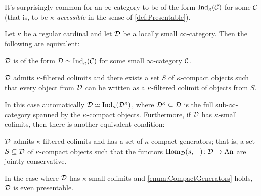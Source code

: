 It's surprisingly common for an $\infty$-category to be of the form $\mathrm{Ind}_\kappa(\mathcal{C})$ for some $\mathcal{C}$ (that is, to be \emph{$\kappa$-accessible} in the sense of \cref{def:Presentable}).
\begin{lem}\label{lem:KappaCompactlyGenerated}
	Let $\kappa$ be a regular cardinal and let $\mathcal{D}$ be a locally small $\infty$-category. Then the following are equivalent:
	\begin{alphanumerate}
		\item $\mathcal{D}$ is of the form $\mathcal{D}\simeq \mathrm{Ind}_\kappa(\mathcal{C})$ for some small $\infty$-category $\mathcal{C}$.\label{enum:DIsIndC}
		\item $\mathcal{D}$ admits $\kappa$-filtered colimits and there exists a set $S$ of $\kappa$-compact objects such that every object from $\mathcal{D}$ can be written as a $\kappa$-filtered colimit of objects from $S$.\label{enum:DGeneratedUnderFilteredColimits}
	\end{alphanumerate}
	In this case automatically $\mathcal{D}\simeq \mathrm{Ind}_\kappa(\mathcal{D}^\kappa)$, where $\mathcal{D}^\kappa\subseteq \mathcal{D}$ is the full sub-$\infty$-category spanned by the $\kappa$-compact objects. Furthermore, if $\mathcal{D}$ has $\kappa$-small colimits, then there is another equivalent condition:
	\begin{alphanumerate}[resume]
		\item $\mathcal{D}$ admits $\kappa$-filtered colimits and has a set of $\kappa$-compact generators; that is, a set $S\subseteq \mathcal{D}$ of $\kappa$-compact objects such that the functors $\operatorname{Hom}_{\mathcal{D}}(s,-)\colon \mathcal{D}\rightarrow\mathrm{An}$ are jointly conservative.\label{enum:CompactGenerators}
	\end{alphanumerate}%
	In the case where $\mathcal{D}$ has $\kappa$-small colimits and \cref{enum:CompactGenerators} holds, $\mathcal{D}$ is even presentable.
\end{lem}

